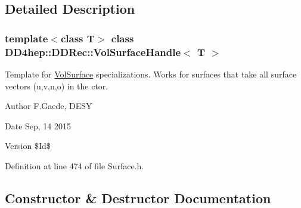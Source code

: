 \subsection{Detailed Description}
\subsubsection*{template$<$class T$>$\newline
class D\+D4hep\+::\+D\+D\+Rec\+::\+Vol\+Surface\+Handle$<$ T $>$}

Template for \hyperlink{class_d_d4hep_1_1_d_d_rec_1_1_vol_surface}{Vol\+Surface} specializations. Works for surfaces that take all surface vectors (u,v,n,o) in the c\textquotesingle{}tor. \begin{DoxyAuthor}{Author}
F.\+Gaede, D\+E\+SY 
\end{DoxyAuthor}
\begin{DoxyDate}{Date}
Sep, 14 2015 
\end{DoxyDate}
\begin{DoxyVersion}{Version}
\$\+Id\$ 
\end{DoxyVersion}


Definition at line 474 of file Surface.\+h.



\subsection{Constructor \& Destructor Documentation}
\hypertarget{class_d_d4hep_1_1_d_d_rec_1_1_vol_surface_handle_a94c84574cd5621be9f053d0734f80e46}{}\label{class_d_d4hep_1_1_d_d_rec_1_1_vol_surface_handle_a94c84574cd5621be9f053d0734f80e46} 
